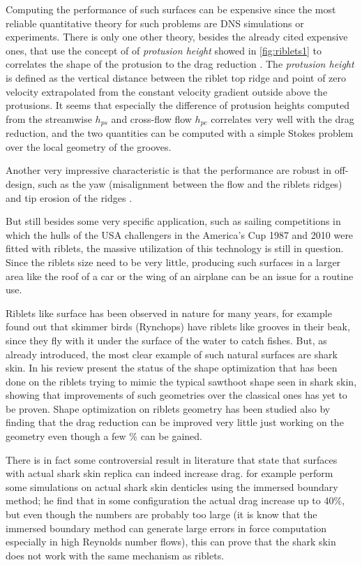 Computing the performance of such surfaces can be expensive since the most reliable quantitative theory for such problems are DNS simulations or experiments.
There is only one other theory, besides the already cited expensive ones, that use the concept of of \textit{protusion height} showed in \ref{fig:riblets1} to correlates the shape of the protusion to the drag reduction \citet{luchini1991resistance}.
The \textit{protusion height} is defined as the vertical distance between the riblet top ridge and point of zero velocity extrapolated from the constant velocity gradient outside above the protusions.
It seems that especially the difference of protusion heights computed from the streamwise $h_{ps}$ and cross-flow flow $h_{pc}$ correlates very well with the drag reduction, and the two quantities can be computed with a simple Stokes problem over the local geometry of the grooves.

Another very impressive characteristic is that the performance are robust in off-design, such as the yaw (misalignment between the flow and the riblets ridges) and tip erosion of the ridges \citet{garcia2011drag}.

But still besides some very specific application, such as  sailing competitions in which the hulls of the USA challengers in the America’s Cup 1987 and 2010 were fitted with riblets, the massive utilization of this technology is still in question.
Since the riblets size need to be very little, producing such surfaces in a larger area like the roof of a car or the wing of an airplane can be an issue for a routine use.

Riblets like surface has been observed in nature for many years, for example \citet{Martin2016riblets} found out that skimmer birds (Rynchops) have riblets like grooves in their beak, since they fly with it under the surface of the water to catch fishes.
But, as already introduced, the most clear example of such natural surfaces are shark skin.
In his review \citet{dean2010shark} present the status of the shape optimization that has been done on the riblets trying to mimic the typical sawthoot shape seen in shark skin, showing that improvements of such geometries over the classical ones has yet to be proven.
Shape optimization on riblets geometry has been studied also by \citet{bechert1997experiments} finding that the drag reduction can be improved very little just working on the geometry even though a few $\%$ can be gained.

There is in fact some controversial result in literature that state that surfaces with actual shark skin replica can indeed increase drag.
\citet{boomsma2016direct} for example perform some simulations on actual shark skin denticles using the immersed boundary method; he find that in some configuration 
the actual drag increase up to $40\%$, but even though the numbers are probably too large (it is know that the immersed boundary method can generate large errors in force computation especially in high Reynolds number flows), this can prove that the shark skin does not work with the same mechanism as riblets.

